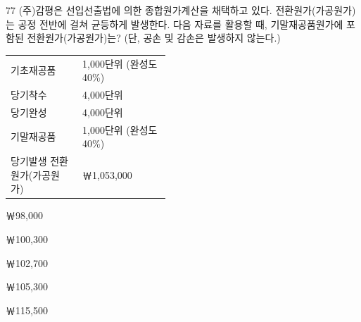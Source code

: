 \begin{question}{77}
(주)감평은 선입선출법에 의한 종합원가계산을 채택하고 있다. 전환원가(가공원가)는 공정 전반에 걸쳐 균등하게 발생한다. 다음 자료를 활용할 때, 기말재공품원가에 포함된 전환원가(가공원가)는? (단, 공손 및 감손은 발생하지 않는다.)
\begin{framedtext}
\noindent\begin{tabular}{@{}p{0.45\linewidth}l@{}}
기초재공품 & 1,000단위 (완성도 40\%) \\
당기착수 & 4,000단위 \\
당기완성 & 4,000단위 \\
기말재공품 & 1,000단위 (완성도 40\%) \\
당기발생 전환원가(가공원가) & ￦1,053,000 \\
\end{tabular}
\end{framedtext}
\begin{choices}
  \item ￦98,000
  \item ￦100,300
  \item ￦102,700
  \item ￦105,300
  \item ￦115,500
\end{choices}
\end{question}
